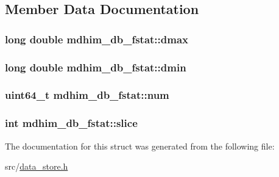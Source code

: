 \subsection{Member Data Documentation}
\hypertarget{structmdhim__db__fstat_a6a955791d2278a8f27816149f294b930}{
\subsubsection[{dmax}]{\setlength{\rightskip}{0pt plus 5cm}long double mdhim\-\_\-db\-\_\-fstat\-::dmax}}\label{d6/dca/structmdhim__db__fstat_a6a955791d2278a8f27816149f294b930}
\hypertarget{structmdhim__db__fstat_a945705f2eeeb829955e11d21a9377b0f}{
\subsubsection[{dmin}]{\setlength{\rightskip}{0pt plus 5cm}long double mdhim\-\_\-db\-\_\-fstat\-::dmin}}\label{d6/dca/structmdhim__db__fstat_a945705f2eeeb829955e11d21a9377b0f}
\hypertarget{structmdhim__db__fstat_a4ce8dc02a9a126e5079a50ba3509a49b}{
\subsubsection[{num}]{\setlength{\rightskip}{0pt plus 5cm}uint64\-\_\-t mdhim\-\_\-db\-\_\-fstat\-::num}}\label{d6/dca/structmdhim__db__fstat_a4ce8dc02a9a126e5079a50ba3509a49b}
\hypertarget{structmdhim__db__fstat_a058b21688809dbc426bf464f967c5bf3}{
\subsubsection[{slice}]{\setlength{\rightskip}{0pt plus 5cm}int mdhim\-\_\-db\-\_\-fstat\-::slice}}\label{d6/dca/structmdhim__db__fstat_a058b21688809dbc426bf464f967c5bf3}


The documentation for this struct was generated from the following file\-:\begin{DoxyCompactItemize}
\item 
src/\hyperlink{data__store_8h}{data\-\_\-store.\-h}\end{DoxyCompactItemize}
